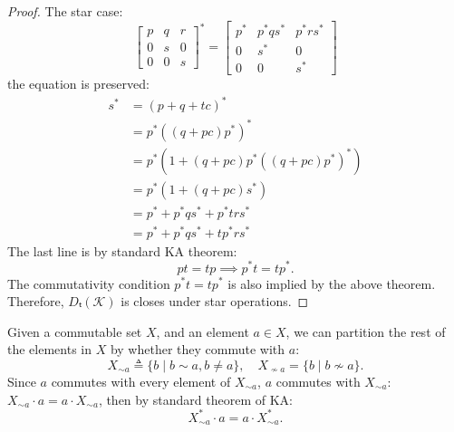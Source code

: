 \begin{proof}
  The star case:
  \[
    \begin{bmatrix}
      p & q & r \\
      0 & s & 0 \\  
      0 & 0 & s
    \end{bmatrix}^*
    = 
    \begin{bmatrix}
      p^*  & p^*  q s^* & p^*  r s^* \\
      0 & s^* & 0 \\  
      0 & 0 & s^*
    \end{bmatrix}
  \]
  the equation is preserved:
  \begin{align*}
    s^* & = (p + q + t c)^* \\  
    & = p^* ((q + pc) p^*)^*\\
    & = p^* (1 + (q + pc) p^* ((q + pc) p^* )^*) \\
    & = p^* (1 + (q + pc) s^*) \\ 
    & = p^* + p^* q s^* + p^* t r s^* \\
    & = p^* + p^* q s^* + t p^* r s^*
  \end{align*}
  The last line is by standard KA theorem:
  \[p t = t p ⟹ p^*  t = t p^* .\]
  The commutativity condition \(p^*  t = t p^*\) is also implied by the above theorem.
  Therefore, \(Dₜ(𝒦)\) is closes under star operations.
\end{proof}

Given a commutable set \(X\), and an element \(a ∈ X\),
we can partition the rest of the elements in \(X\)
by whether they commute with \(a\):
\[X_{∼ a} ≜ \{b ∣ b ∼ a, b ≠ a\}, \quad X_{≁ a} = \{b ∣ b ≁ a\}.\]
Since \(a\) commutes with every element of \(X_{∼ a}\), 
\(a\) commutes with \(X_{∼ a}\): \(X_{∼ a} ⋅ a = a ⋅ X_{∼ a}\),
then by standard theorem of KA: \[X_{∼ a}^* ⋅ a = a ⋅ X_{∼ a}^*.\]

